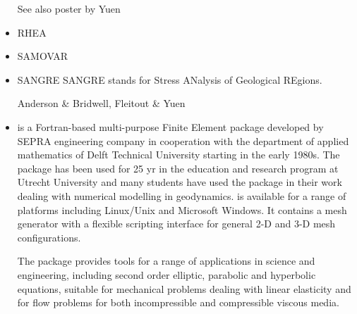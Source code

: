 \begin{itemize}
See also poster by Yuen

\item RHEA 

{\scriptsize
\noindent
\textcite{bugg08}
\textcite{stgb10}
\textcite{algs12}
\textcite{busa13}
}

\item SAMOVAR

{\scriptsize
\noindent
\textcite{elga10}
}


\item {\codefont SANGRE} 
SANGRE stands for Stress ANalysis of Geological REgions.

\begin{scriptsize}
Anderson \& Bridwell\cite{anbr80},
Fleitout \& Yuen \cite{flyu84,flyu84b}
\end{scriptsize}

\item \sepran 
{}

\sepran \cite{sepr05} is a Fortran-based
multi-purpose Finite Element package developed by SEPRA engineering company in
cooperation with the department of applied mathematics of Delft Technical University
starting in the early 1980s. The package has been used for 25 yr in the education and
research program at Utrecht University and many students have used the package in
their work dealing with numerical modelling in geodynamics. \sepran is available for
a range of platforms including Linux/Unix and Microsoft Windows. It contains a mesh
generator with a flexible scripting interface for general 2-D and 3-D mesh configurations.

The package provides tools for a range of applications in science and engineering, including 
second order elliptic, parabolic and hyperbolic equations, suitable for mechanical 
problems dealing with linear elasticity and for flow problems for both incompressible
and compressible viscous media.


\end{itemize}
